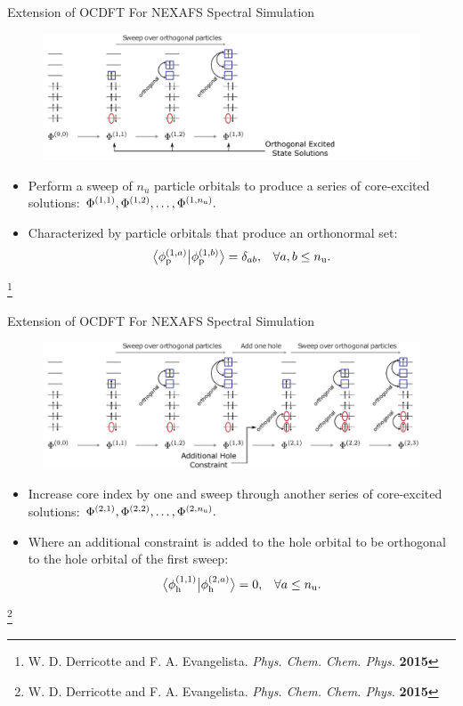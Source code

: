 \documentclass[t]{beamer}
\newcommand\blfootnote[1]{%
  \begingroup
  \renewcommand\thefootnote{}\footnote{#1}%
  \addtocounter{footnote}{-1}%
  \endgroup
}
\newcommand{\braket}[3][0]
{\ifthenelse{\equal{#1}{0}}{\left\langle #2 \middle| #3 \right\rangle}
{\ifthenelse{\equal{#1}{1}}{\big\langle #2 \big| #3 \big\rangle}
{\ifthenelse{\equal{#1}{2}}{\Big\langle #2 \Big| #3 \Big\rangle}
{\ifthenelse{\equal{#1}{3}}{\bigg\langle #2 \bigg| #3 \bigg\rangle}
{\ifthenelse{\equal{#1}{4}}{\Bigg\langle #2 \Bigg| #3 \Bigg\rangle}
{Error}}}}}
}
\begin{document}
\begin{frame}{Extension of OCDFT For NEXAFS Spectral Simulation}
\begin{figure}[!t]
\includegraphics[scale=0.65]{CMHP_alg2.pdf}
\end{figure}
\begin{itemize}
\item Perform a sweep of $n_u$ particle orbitals to produce a series of core-excited solutions: $\Phi^{(1,1)}, \Phi^{(1,2)}, \ldots, \Phi^{(1,n_{\rm u})}.$
\item Characterized by particle orbitals that produce an orthonormal set:
\begin{align}
\braket[1]{\phi^{(1,a)}_{\rm p}}{\phi^{(1,b)}_{\rm p}} &= \delta_{ab}, &\forall a,b \leq n_{\rm u}.
\end{align}
\end{itemize}
\blfootnote{W. D. Derricotte and F. A. Evangelista. \textit{Phys. Chem. Chem. Phys.} \textbf{2015}}
\end{frame}
\begin{frame}{Extension of OCDFT For NEXAFS Spectral Simulation}
\begin{figure}[!t]
\includegraphics[scale=0.65]{CMHP_alg3.pdf}
\end{figure}
\begin{itemize}
\item Increase core index by one and sweep through another series of core-excited solutions: $\Phi^{(2,1)}, \Phi^{(2,2)}, \ldots, \Phi^{(2,n_{\rm u})}.$
\item Where an additional constraint is added to the hole orbital to be orthogonal to the hole orbital of the first sweep:
\begin{align}
\braket[1]{\phi^{(1,1)}_{\rm h}}{\phi^{(2,a)}_{\rm h}} &=0,&\forall a \leq n_{\rm u}.
\end{align}
\end{itemize}
\blfootnote{W. D. Derricotte and F. A. Evangelista. \textit{Phys. Chem. Chem. Phys.} \textbf{2015}}
\end{frame}
\end{document}
